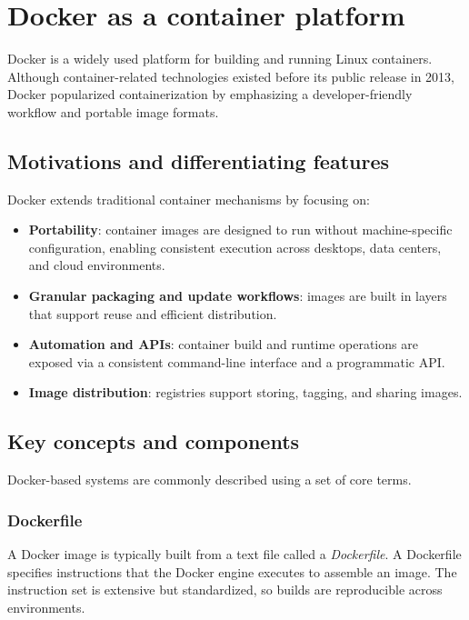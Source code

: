 \documentclass[11pt,a4paper,openany]{report}
\begin{document}
\section{Docker as a container platform}

Docker is a widely used platform for building and running Linux containers. Although container-related technologies existed before its public release in 2013, Docker popularized containerization by emphasizing a developer-friendly workflow and portable image formats.

\subsection{Motivations and differentiating features}

Docker extends traditional container mechanisms by focusing on:

\begin{itemize}
\item \textbf{Portability}: container images are designed to run without machine-specific configuration, enabling consistent execution across desktops, data centers, and cloud environments.
\item \textbf{Granular packaging and update workflows}: images are built in layers that support reuse and efficient distribution.
\item \textbf{Automation and APIs}: container build and runtime operations are exposed via a consistent command-line interface and a programmatic API.
\item \textbf{Image distribution}: registries support storing, tagging, and sharing images.
\end{itemize}

\subsection{Key concepts and components}

Docker-based systems are commonly described using a set of core terms.

\subsubsection*{Dockerfile}

A Docker image is typically built from a text file called a \emph{Dockerfile}. A Dockerfile specifies instructions that the Docker engine executes to assemble an image. The instruction set is extensive but standardized, so builds are reproducible across environments.
\end{document}

